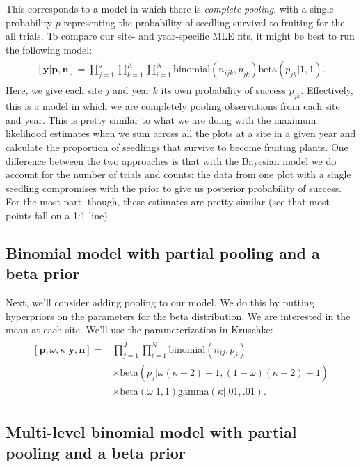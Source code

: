 \documentclass[12pt, oneside, titlepage]{article}   	%
\begin{document}
This corresponds to a model in which there is \textit{complete pooling}, with a single probability $p$ representing the probability of seedling survival to fruiting for the all trials. To compare our site- and year-specific MLE fits, it might be best to run the following model:
%
\begin{align}
  \begin{split}
[\bm{y}|\bm{p},\bm{n}]  = \prod_{j=1}^J\prod_{k=1}^K\prod_{i=1}^N \mathrm{binomial}(n_{ijk},p_{jk}) \mathrm{beta} (  p_{jk} | 1 , 1 ).
  \end{split}
\end{align}
Here, we give each site $j$ and year $k$ its own probability of success $p_{jk}$. Effectively, this is a model in which we are completely pooling observations from each site and year. This is pretty similar to what we are doing with the maximum likelihood estimates when we sum across all the plots at a site in a given year and calculate the proportion of seedlings that survive to become fruiting plants. One difference between the two approaches is that with the Bayesian model we do account for the number of trials and counts; the data from one plot with a single seedling compromises with the prior to give us posterior probability of success. For the most part, though, these estimates are pretty similar (see that most points fall on a 1:1 line).

\subsection*{Binomial model with partial pooling and a beta prior}

Next, we'll consider adding pooling to our model. We do this by putting hyperpriors on the parameters for the beta distribution. We are interested in the mean at each site. We'll use the parameterization in Kruschke:
%
\begin{align}
  \begin{split}
[\bm{p},\omega,\kappa|\bm{y},\bm{n}]  = & \prod_{j=1}^J\prod_{i=1}^N \mathrm{binomial}(n_{ij},p_{j}) 
    \\ & \times \mathrm{beta} (  p_{j} | \omega(\kappa-2) +1 , (1-\omega) (\kappa -2) + 1) 
    \\ & \times \mathrm{beta} ( \omega | 1, 1) \mathrm{gamma} ( \kappa | .01, .01)  .
  \end{split}
\end{align}

\subsection*{Multi-level binomial model with partial pooling and a beta prior}
\end{document}
